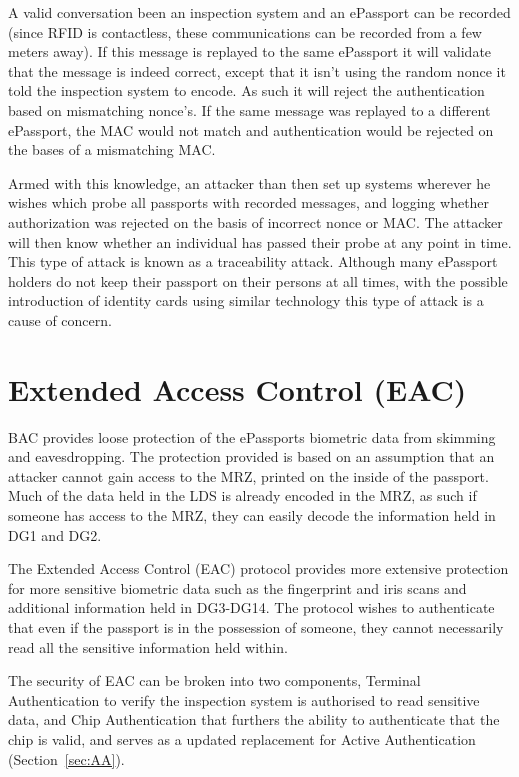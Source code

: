 \documentclass[12pt]{article}
\begin{document}
A valid conversation been an inspection system and an ePassport can be recorded (since RFID is contactless, these communications can be recorded from a few meters away). If this message is replayed to the same ePassport it will validate that the message is indeed correct, except that it isn't using the random nonce it told the inspection system to encode. As such it will reject the authentication based on mismatching nonce's. If the same message was replayed to a different ePassport, the MAC would not match and authentication would be rejected on the bases of a mismatching MAC.

Armed with this knowledge, an attacker than then set up systems wherever he wishes which probe all passports with recorded messages, and logging whether authorization was rejected on the basis of incorrect nonce or MAC. The attacker will then know whether an individual has passed their probe at any point in time. This type of attack is known as a traceability attack. Although many ePassport holders do not keep their passport on their persons at all times, with the possible introduction of identity cards using similar technology this type of attack is a cause of concern.

\section{Extended Access Control (EAC)}
\label{sec:EAC}
BAC provides loose protection of the ePassports biometric data from skimming and eavesdropping. The protection provided is based on an assumption that an attacker cannot gain access to the MRZ, printed on the inside of the passport. Much of the data held in the LDS is already encoded in the MRZ, as such if someone has access to the MRZ, they can easily decode the information held in DG1 and DG2. 

The Extended Access Control (EAC) protocol provides more extensive protection for more sensitive biometric data such as the fingerprint and iris scans and additional information held in DG3-DG14. The protocol wishes to authenticate that even if the passport is in the possession of someone, they cannot necessarily read all the sensitive information held within.

The security of EAC can be broken into two components, Terminal Authentication to verify the inspection system is authorised to read sensitive data, and Chip Authentication that furthers the ability to authenticate that the chip is valid, and serves as a updated replacement for Active Authentication (Section~\ref{sec:AA}).
\end{document}
